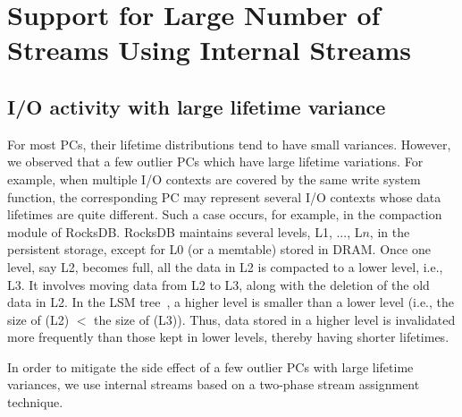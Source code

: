 \section{Support for Large Number of Streams Using Internal Streams}


\subsection{I/O activity with large lifetime variance}
For most PCs, their lifetime distributions tend to have small variances.  
However, we observed that a few outlier PCs which have large lifetime variations. 
For example, when multiple I/O contexts are covered by the same write system function, 
the corresponding PC may represent several I/O contexts whose data lifetimes are quite different.   
Such a case occurs, for example, 
in the compaction module of RocksDB.
RocksDB maintains
several levels, L1, ..., L$n$, in the persistent storage, except for L0 (or a
memtable) stored in DRAM.  Once one level, say L2, becomes full, all the data
in L2 is compacted to a lower level, i.e., L3.  It involves moving data from L2
to L3, along with the deletion of the old data in L2.  In the
LSM tree~\cite{LSM}, a higher level is smaller than a lower level 
(i.e., the size of (L2) $<$ the size of (L3)). 
Thus, data stored in a higher level is invalidated more frequently than those kept
in lower levels, thereby having shorter lifetimes.

In order to mitigate the side effect of a few outlier PCs with large lifetime variances, 
we use internal streams based on a two-phase stream assignment technique.



